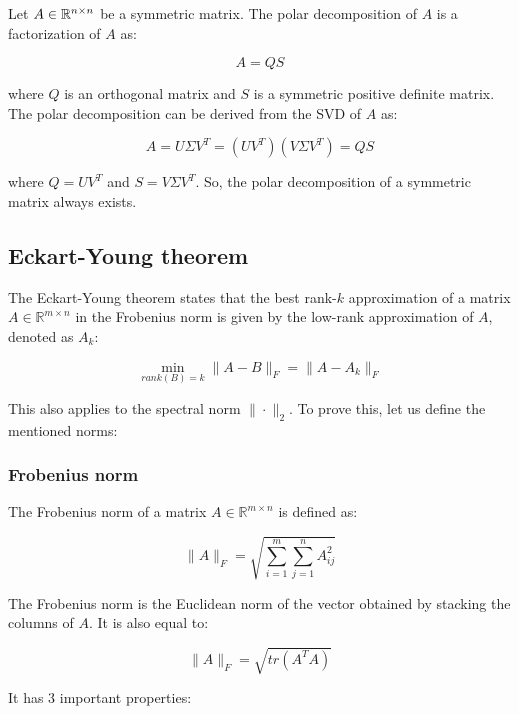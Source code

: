 Let $A \in \mathbb{R}^{n \times n}$ be a symmetric matrix. The polar decomposition of $A$ is a factorization of $A$ as:

\begin{equation}
    A = Q S
\end{equation}

where $Q$ is an orthogonal matrix and $S$ is a symmetric positive definite matrix. 
The polar decomposition can be derived from the SVD of $A$ as:

\begin{equation}
    A = U \Sigma V^T = (U V^T) (V \Sigma V^T) = Q S
\end{equation}

where $Q = U V^T$ and $S = V \Sigma V^T$. So, the polar decomposition of a symmetric matrix
always exists.

\subsection{Eckart-Young theorem}

The Eckart-Young theorem states that the best rank-$k$ approximation of a matrix $A \in \mathbb{R}^{m \times n}$ in the Frobenius norm
is given by the low-rank approximation of $A$, denoted as $A_k$:

\begin{equation}
    \min_{rank(B) = k} \|A - B\|_F = \|A - A_k\|_F
\end{equation}

This also applies to the spectral norm $\| \cdot \|_2$. To prove this, let us define the mentioned
norms:

\subsubsection{Frobenius norm}

The Frobenius norm of a matrix $A \in \mathbb{R}^{m \times n}$ is defined as:

\begin{equation}
    \|A\|_F = \sqrt{\sum_{i=1}^{m} \sum_{j=1}^{n} A_{ij}^2}
\end{equation}

The Frobenius norm is the Euclidean norm of the vector obtained by stacking the columns of $A$.
It is also equal to:

\begin{equation}
    \|A\|_F = \sqrt{tr(A^T A)}
\end{equation}

It has 3 important properties:

